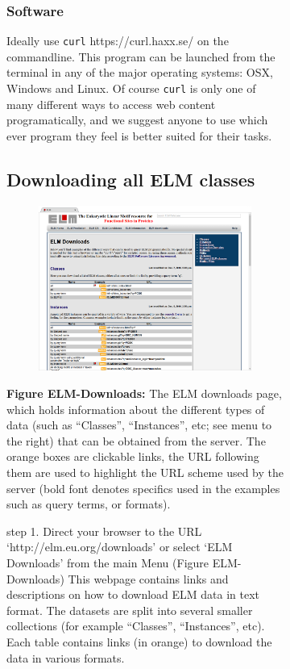 {\begin{figure}[h!]
{{\begin{figure}[h!]
{{\subsubsection{Software}\label{software-1}

Ideally use \texttt{curl} https://curl.haxx.se/ on the commandline. This
program can be launched from the terminal in any of the major operating
systems: OSX, Windows and Linux. Of course \texttt{curl} is only one of
many different ways to access web content programatically, and we
suggest anyone to use which ever program they feel is better suited for
their tasks.

\subsection{Downloading all ELM
classes}\label{downloading-all-elm-classes}

\begin{figure}[htbp]
\centering
\includegraphics[width=\textwidth]{Figures/BACT_2/elm_downloads_html.png}
\caption{
}
\end{figure}

\textbf{Figure ELM-Downloads:} The ELM downloads page, which holds
information about the different types of data (such as ``Classes'',
``Instances'', etc; see menu to the right) that can be obtained from the
server. The orange boxes are clickable links, the URL following them are
used to highlight the URL scheme used by the server (bold font denotes
specifics used in the examples such as query terms, or formats).

step 1. Direct your browser to the URL `http://elm.eu.org/downloads' or
select `ELM Downloads' from the main Menu (Figure ELM-Downloads) This
webpage contains links and descriptions on how to download ELM data in
text format. The datasets are split into several smaller collections
(for example ``Classes'', ``Instances'', etc). Each table contains links
(in orange) to download the data in various formats.

}}
\end{figure}}}
\end{figure}}
